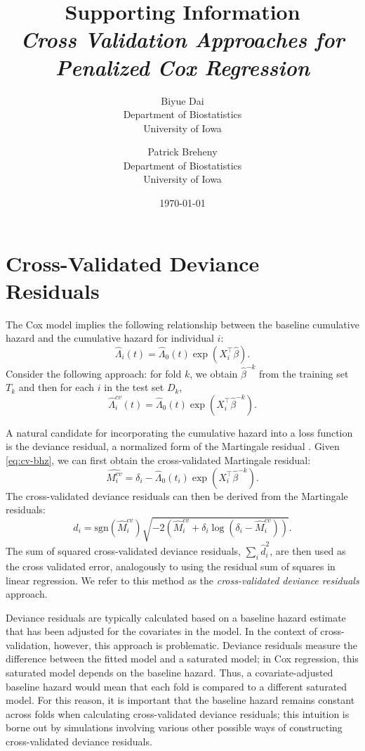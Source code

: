 \documentclass{article}
\title{Supporting Information\\
\textit{Cross Validation Approaches for Penalized Cox Regression}}
\author{Biyue Dai\\Department of Biostatistics\\University of Iowa
  \and
  Patrick Breheny\\Department of Biostatistics\\University of Iowa}
\date{\today}
\providecommand{\Tr}{^{\scriptscriptstyle\top}}
\begin{document}
\maketitle

\section{Cross-Validated Deviance Residuals}

The Cox model implies the following relationship between the baseline cumulative hazard and the cumulative hazard for individual $i$:
\begin{equation}
  \hat{\Lambda}_{i}(t) =  \hat{\Lambda}_{0}(t)\exp(X_i\Tr\hat\beta).
\end{equation}
Consider the following approach: for fold $k$, we obtain $\hat{\beta}^{-k}$ from the training set $T_k$ and then for each $i$ in the test set $D_k$, 
\begin{equation}
 \label{eq:cv-bhz}
  \hat{\Lambda}^{cv}_{i}(t) =  \hat{\Lambda}_{0}(t)\exp(X_i\Tr\hat\beta^{-k}).
\end{equation}

A natural candidate for incorporating the cumulative hazard into a loss function is the deviance residual, a normalized form of the Martingale residual \citep{Therneau1990}.  Given \eqref{eq:cv-bhz}, we can first obtain the cross-validated Martingale residual: 
\begin{equation}
  \hat{M^{cv}_{i}} = \delta_{i} - \hat{\Lambda}_{0}(t_{i})\exp(X_i\Tr\hat\beta^{-k}).
\end{equation}
The cross-validated deviance residuals can then be derived from the Martingale residuals: 
\begin{equation} 
  d_{i} = \text{sgn}(\hat{M}^{cv}_{i})\sqrt{-2(\hat{M}^{cv}_{i} + \delta_{i}\log(\delta_{i} - \hat{M}^{cv}_{i}))}.
\end{equation}
The sum of squared cross-validated deviance residuals, $\sum_{i}\hat{d}_{i}^2$, are then used as the cross validated error, analogously to using the residual sum of squares in linear regression. We refer to this method as the \emph{cross-validated deviance residuals} approach.

Deviance residuals are typically calculated based on a baseline hazard estimate that has been adjusted for the covariates in the model. In the context of cross-validation, however, this approach is problematic. Deviance residuals measure the difference between the fitted model and a saturated model; in Cox regression, this saturated model depends on the baseline hazard. Thus, a covariate-adjusted baseline hazard would mean that each fold is compared to a different saturated model. For this reason, it is important that the baseline hazard remains constant across folds when calculating cross-validated deviance residuals; this intuition is borne out by simulations involving various other possible ways of constructing cross-validated deviance residuals.  
\end{document}
